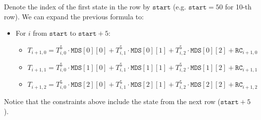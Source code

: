 Denote the index of the first state in the row by $\texttt{start}$ (e.g. $\texttt{start}=50$ for 10-th row).
We can expand the previous formula to:
\begin{itemize}
    \item For $i$ from $\texttt{start}$ to $\texttt{start} + 5$:
    \begin{itemize}
        \item $T_{i + 1, 0} = T_{i, 0}^5 \cdot \texttt{MDS}[0][0] + T_{i, 1}^5 \cdot
        \texttt{MDS}[0][1] + T_{i, 2}^5 \cdot \texttt{MDS}[0][2] + \texttt{RC}_{i + 1, 0}$
        \item $T_{i + 1, 1} = T_{i, 0}^5 \cdot \texttt{MDS}[1][0] + T_{i, 1}^5 \cdot
        \texttt{MDS}[1][1] + T_{i, 2}^5 \cdot \texttt{MDS}[1][2] + \texttt{RC}_{i + 1, 1}$
        \item $T_{i + 1, 2} = T_{i, 0}^5 \cdot \texttt{MDS}[2][0] + T_{i, 1}^5 \cdot
        \texttt{MDS}[2][1] + T_{i, 2}^5 \cdot \texttt{MDS}[2][2] + \texttt{RC}_{i + 1, 2}$
    \end{itemize}
\end{itemize}

Notice that the constraints above include the state from the next row ($\texttt{start} + 5$).